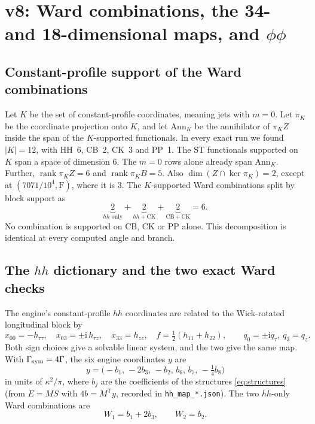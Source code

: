 \documentclass[11pt,a4paper]{article}
\newcommand{\ii}{\mathrm i}
\newcommand{\ka}{\kappa}
\newcommand{\Fr}{\mathrm F}
\newcommand{\rank}{\operatorname{rank}}
\newcommand{\abs}[1]{\lvert#1\rvert}
\newcommand{\loc}[1]{\nolinkurl{#1}}
\theoremstyle{plain}
\theoremstyle{definition}
\theoremstyle{remark}
\numberwithin{equation}{section}
\begin{document}
\section{v8: Ward combinations, the 34- and 18-dimensional maps, and \texorpdfstring{\(\phi\phi\)}{phi phi}}
\label{sec:v8map}

\subsection{Constant-profile support of the Ward combinations}

Let \(K\) be the set of constant-profile coordinates, meaning jets
with \(m=0\). Let \(\pi_K\) be the coordinate projection onto
\(K\), and let \(\mathrm{Ann}_K\) be the annihilator of \(\pi_K Z\)
inside the span of the \(K\)-supported functionals. In every exact
run we found \(\abs K=12\), with HH~6, CB~2, CK~3 and PP~1. The
ST functionals supported on \(K\) span a space of dimension
\(6\). The \(m=0\) rows alone already span \(\mathrm{Ann}_K\).
Further, \(\rank\pi_KZ=6\) and \(\rank\pi_KB=5\). Also
\(\dim(Z\cap\ker\pi_K)=2\), except at \((7071/10^4,\Fr)\), where it
is \(3\).
The \(K\)-supported Ward combinations split by block support as
\[
 \underbrace{2}_{hh\text{ only}}+\underbrace{2}_{hh+\mathrm{CK}}
 +\underbrace{2}_{\mathrm{CB}+\mathrm{CK}}=6.
\]
No combination is supported on CB, CK or PP alone.
This decomposition is identical at every computed angle and
branch.

\subsection{The \texorpdfstring{\(hh\)}{hh} dictionary and the two exact Ward checks}

The engine's constant-profile \(hh\) coordinates are related to
the Wick-rotated longitudinal block by
\[
 x_{00}=-h_{\tau\tau},\quad x_{03}=\pm\ii\,h_{\tau z},\quad
 x_{33}=h_{zz},\quad f=\tfrac12(h_{11}+h_{22}),\qquad
 q_0=\pm\ii q_\tau,\ q_3=q_z.
\]
Both sign choices give a solvable linear system, and the two
give the same map. With
\(\Gamma_{\rm sym}=4\Gamma\), the six engine coordinates
\(y\) are
\[
 y=\bigl(-b_1,\,-2b_3,\,-b_2,\,b_6,\,b_7,\,-\tfrac14 b_8\bigr)
\]
in units of \(\ka^2/\pi\), where \(b_j\) are the coefficients of the
structures \eqref{eq:structures}
(from \(E=MS\) with \(4b=M^{\mathsf T}y\), recorded in
\loc{hh_map_*.json}).
The two \(hh\)-only Ward combinations are
\[
 W_1=b_1+2b_3,\qquad W_2=b_2 .
\]
\end{document}
